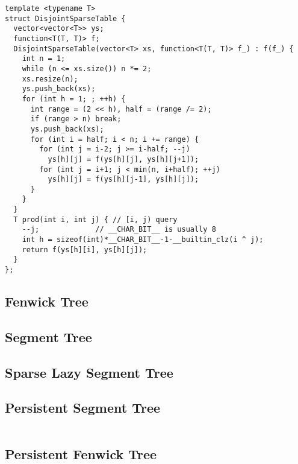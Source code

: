\begin{lstlisting}
template <typename T>
struct DisjointSparseTable {
  vector<vector<T>> ys;
  function<T(T, T)> f;
  DisjointSparseTable(vector<T> xs, function<T(T, T)> f_) : f(f_) {
    int n = 1;
    while (n <= xs.size()) n *= 2;
    xs.resize(n);
    ys.push_back(xs);
    for (int h = 1; ; ++h) {
      int range = (2 << h), half = (range /= 2);
      if (range > n) break;
      ys.push_back(xs);
      for (int i = half; i < n; i += range) {
        for (int j = i-2; j >= i-half; --j) 
          ys[h][j] = f(ys[h][j], ys[h][j+1]);
        for (int j = i+1; j < min(n, i+half); ++j) 
          ys[h][j] = f(ys[h][j-1], ys[h][j]);
      }
    }
  }
  T prod(int i, int j) { // [i, j) query
    --j;             // __CHAR_BIT__ is usually 8
    int h = sizeof(int)*__CHAR_BIT__-1-__builtin_clz(i ^ j);
    return f(ys[h][i], ys[h][j]);
  }
};
\end{lstlisting}

\subsection{Fenwick Tree}
\subsection{Segment Tree}
\subsection{Sparse Lazy Segment Tree}
\subsection{Persistent Segment Tree}

\hrulefill \vspace{-\baselineskip}
\begin{multicols}{2}
\inputminted[autogobble,fontsize=\footnotesize]{C++}{Data Structures/persistant_segtree.cpp}
\end{multicols}
\vspace{-\baselineskip}
\noindent \hrulefill

\newpage

\subsection{Persistent Fenwick Tree}


